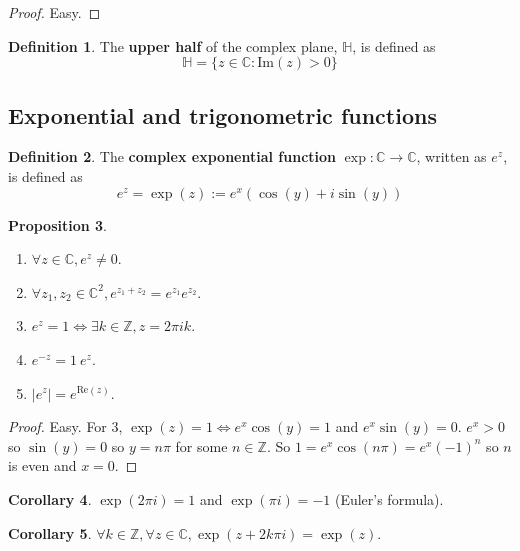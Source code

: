 \documentclass[12pt,a4paper]{article}
\theoremstyle{definition}
\newtheorem{definition}{Definition}[subsection]
\newtheorem{proposition}[definition]{Proposition}
\newtheorem{corollary}[definition]{Corollary}
\begin{document}
\begin{proof}
	Easy.
\end{proof}

\begin{definition}
	The \textbf{upper half} of the complex plane, $\mathbb{H}$, is defined as
	\[
		\mathbb{H} = \{ z \in \mathbb{C}: \text{Im}(z) > 0 \}
	\]
\end{definition}

\subsection{Exponential and trigonometric functions}

\begin{definition}
	The \textbf{complex exponential function} $\exp: \mathbb{C} \rightarrow \mathbb{C}$, written as $e^z$, is defined as
	\[
		e^z = \exp(z) := e^x (\cos(y) + i \sin(y))
	\]
\end{definition}

\begin{proposition}
	\hfill
	\begin{enumerate}
		\item $\forall z \in \mathbb{C}, e^z \ne 0$.
		\item $\forall z_1, z_2 \in \mathbb{C}^2, e^{z_1 + z_2} = e^{z_1} e^{z_2}$.
		\item $e^z = 1 \Longleftrightarrow \exists k \in \mathbb{Z}, z = 2 \pi i k$.
		\item $e^{-z} = 1 \ e^z$.
		\item $|e^z| = e^{\text{Re}(z)}$.
	\end{enumerate}
\end{proposition}

\begin{proof}
	Easy. For 3, $\exp(z) = 1 \Longleftrightarrow e^x \cos(y) = 1$ and $e^x \sin(y) = 0$. $e^x > 0$ so $\sin(y) = 0$ so $y = n \pi$ for some $n \in \mathbb{Z}$. So $1 = e^x \cos(n \pi) = e^x {(-1)}^n$ so $n$ is even and $x = 0$.
\end{proof}

\begin{corollary}
	$\exp(2 \pi i) = 1$ and $\exp(\pi i) = -1$ (Euler's formula).
\end{corollary}

\begin{corollary}
	$\forall k \in \mathbb{Z}, \forall z \in \mathbb{C}, \exp(z + 2k \pi i) = \exp(z)$.
\end{corollary}
\end{document}
